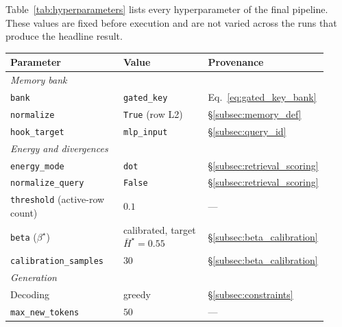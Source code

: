 Table~\ref{tab:hyperparameters} lists every hyperparameter of the
final pipeline. These values are fixed before execution and are not
varied across the runs that produce the headline result.

\begin{table}[H]
    \centering
    \small
    \begin{tabular}{p{0.36\linewidth} p{0.28\linewidth} p{0.28\linewidth}}
        \toprule
        Parameter & Value & Provenance \\
        \midrule
        \multicolumn{3}{l}{\emph{Memory bank}} \\
        \hspace{1em}\texttt{bank}                & \texttt{gated\_key}        & Eq.~\eqref{eq:gated_key_bank} \\
        \hspace{1em}\texttt{normalize}           & \texttt{True} (row L2)     & §\ref{subsec:memory_def} \\
        \hspace{1em}\texttt{hook\_target}        & \texttt{mlp\_input}        & §\ref{subsec:query_id} \\
        \multicolumn{3}{l}{\emph{Energy and divergences}} \\
        \hspace{1em}\texttt{energy\_mode}        & \texttt{dot}               & §\ref{subsec:retrieval_scoring} \\
        \hspace{1em}\texttt{normalize\_query}    & \texttt{False}             & §\ref{subsec:retrieval_scoring} \\
        \hspace{1em}\texttt{threshold} (active-row count) & $0.1$              & — \\
        \hspace{1em}\texttt{beta} ($\beta^\star$)& calibrated, target $\bar{H}^\star = 0.55$ & §\ref{subsec:beta_calibration} \\
        \hspace{1em}\texttt{calibration\_samples}& $30$                       & §\ref{subsec:beta_calibration} \\
        \multicolumn{3}{l}{\emph{Generation}} \\
        \hspace{1em}Decoding                     & greedy                     & §\ref{subsec:constraints} \\
        \hspace{1em}\texttt{max\_new\_tokens}    & $50$                       & — \\

\end{tabular}
\end{table}
